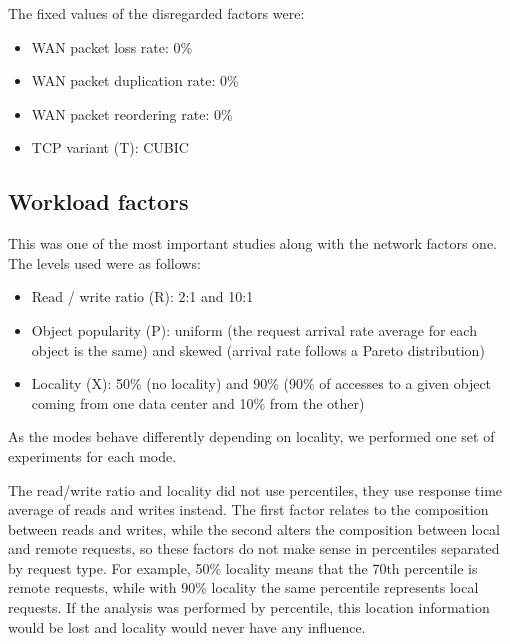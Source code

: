 \documentclass[doublespacing]{bmcart}
\begin{document}
The fixed values of the disregarded factors were:

\begin{itemize}

\item WAN packet loss rate: 0\%

\item WAN packet duplication rate: 0\%

\item WAN packet reordering rate: 0\%

\item TCP variant (T): CUBIC

\end{itemize}

\subsection{Workload factors}

This was one of the most important studies along with the network factors one.
The levels used were as follows:

\begin{itemize}

\item Read / write ratio (R): 2:1 and 10:1

\item Object popularity (P): uniform (the request arrival rate average for each
object is the same) and skewed (arrival rate follows a Pareto
distribution)

\item Locality (X): 50\% (no locality) and 90\% (90\% of accesses to a given
object coming from one data center and 10\% from the other)

\end{itemize}

As the modes behave differently depending on locality, we performed one set of experiments for each mode.

The read/write ratio and locality did not use percentiles, they use response
time average of reads and writes instead. The first factor
relates to the composition between reads and writes, while the second alters the
composition between local and remote requests, so these factors do not make
sense in percentiles separated by request type. For example, 50\% locality means
that the 70th percentile is remote requests, while with 90\% locality the same
percentile represents local requests. If the analysis was performed by
percentile, this location information would be lost and locality would never
have any influence.
\end{document}
